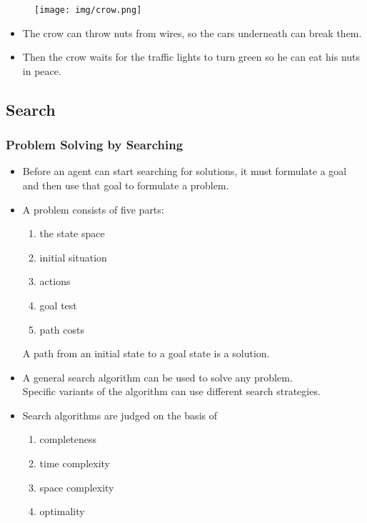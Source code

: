 \documentclass[UTF8,11pt,colorlinks,compress,openany]{beamer}%
\begin{document}
\begin{frame}\frametitle{}
\begin{figure}[H]
\texttt{[image: img/crow.png]}
\end{figure}
\begin{itemize}
	\item The crow can throw nuts from wires, so the cars underneath can break them.
	\item Then the crow waits for the traffic lights to turn green so he can eat his nuts in peace.
\end{itemize}
\end{frame}

\subsection{Search}

\begin{frame}\frametitle{Problem Solving by Searching}
\begin{itemize}
	\item Before an agent can start searching for solutions, it must formulate a goal and then use that goal to formulate a problem.
	\item A problem consists of five parts:
	\begin{enumerate}
	 	\item the state space
	 	\item initial situation
	 	\item actions
	 	\item goal test
	 	\item path costs
	 \end{enumerate}
	 A path from an initial state to a goal state is a solution.
	\item A general search algorithm can be used to solve any problem.\\
	Specific variants of the algorithm can use different search strategies.
	\item Search algorithms are judged on the basis of
	\begin{enumerate}
		\item completeness
		\item time complexity
		\item space complexity
		\item optimality
	\end{enumerate}
\end{itemize}
\end{frame}
\end{document}
